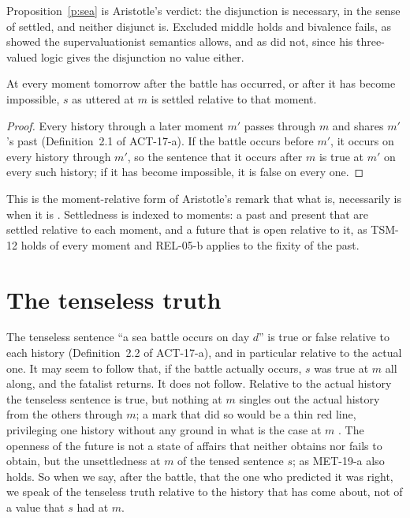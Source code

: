 \documentclass{situationist-preprint}
\begin{document}
Proposition~\ref{p:sea} is Aristotle's verdict: the disjunction is necessary, in the sense of settled, and neither disjunct is. Excluded middle holds and bivalence fails, as \citet{Thomason1970} showed the supervaluationist semantics allows, and as \citet{Lukasiewicz1920} did not, since his three-valued logic gives the disjunction no value either.

\begin{proposition}\label{p:when}
At every moment tomorrow after the battle has occurred, or after it has become impossible, $s$ as uttered at $m$ is settled relative to that moment.
\end{proposition}

\begin{proof}
Every history through a later moment $m'$ passes through $m$ and shares $m'$'s past (Definition~2.1 of ACT-17-a). If the battle occurs before $m'$, it occurs on every history through $m'$, so the sentence that it occurs after $m$ is true at $m'$ on every such history; if it has become impossible, it is false on every one.
\end{proof}

This is the moment-relative form of Aristotle's remark that what is, necessarily is when it is \citep[19a23]{AristotleDeInt}. Settledness is indexed to moments: a past and present that are settled relative to each moment, and a future that is open relative to it, as TSM-12 holds of every moment and REL-05-b applies to the fixity of the past.

\section{The tenseless truth}

The tenseless sentence \enquote{a sea battle occurs on day $d$} is true or false relative to each history (Definition~2.2 of ACT-17-a), and in particular relative to the actual one. It may seem to follow that, if the battle actually occurs, $s$ was true at $m$ all along, and the fatalist returns. It does not follow. Relative to the actual history the tenseless sentence is true, but nothing at $m$ singles out the actual history from the others through $m$; a mark that did so would be a thin red line, privileging one history without any ground in what is the case at $m$ \citep{BelnapGreen1994}. The openness of the future is not a state of affairs that neither obtains nor fails to obtain, but the unsettledness at $m$ of the tensed sentence $s$; as MET-19-a also holds. So when we say, after the battle, that the one who predicted it was right, we speak of the tenseless truth relative to the history that has come about, not of a value that $s$ had at $m$.
\end{document}
